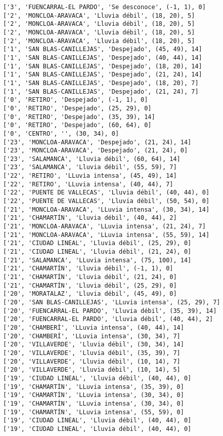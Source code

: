 \documentclass[11pt]{article}
\begin{document}
\begin{Verbatim}[commandchars=\\\{\}]
['3', 'FUENCARRAL-EL PARDO', 'Se desconoce', (-1, 1), 0]
['2', 'MONCLOA-ARAVACA', 'Lluvia débil', (18, 20), 5]
['2', 'MONCLOA-ARAVACA', 'Lluvia débil', (18, 20), 5]
['2', 'MONCLOA-ARAVACA', 'Lluvia débil', (18, 20), 5]
['2', 'MONCLOA-ARAVACA', 'Lluvia débil', (18, 20), 5]
['1', 'SAN BLAS-CANILLEJAS', 'Despejado', (45, 49), 14]
['1', 'SAN BLAS-CANILLEJAS', 'Despejado', (40, 44), 14]
['1', 'SAN BLAS-CANILLEJAS', 'Despejado', (18, 20), 14]
['1', 'SAN BLAS-CANILLEJAS', 'Despejado', (21, 24), 14]
['1', 'SAN BLAS-CANILLEJAS', 'Despejado', (18, 20), 7]
['1', 'SAN BLAS-CANILLEJAS', 'Despejado', (21, 24), 7]
['0', 'RETIRO', 'Despejado', (-1, 1), 0]
['0', 'RETIRO', 'Despejado', (25, 29), 0]
['0', 'RETIRO', 'Despejado', (35, 39), 14]
['0', 'RETIRO', 'Despejado', (60, 64), 0]
['0', 'CENTRO', '', (30, 34), 0]
['23', 'MONCLOA-ARAVACA', 'Despejado', (21, 24), 14]
['23', 'MONCLOA-ARAVACA', 'Despejado', (21, 24), 0]
['23', 'SALAMANCA', 'Lluvia débil', (60, 64), 14]
['23', 'SALAMANCA', 'Lluvia débil', (55, 59), 7]
['22', 'RETIRO', 'LLuvia intensa', (45, 49), 14]
['22', 'RETIRO', 'LLuvia intensa', (40, 44), 7]
['22', 'PUENTE DE VALLECAS', 'Lluvia débil', (40, 44), 0]
['22', 'PUENTE DE VALLECAS', 'Lluvia débil', (50, 54), 0]
['21', 'MONCLOA-ARAVACA', 'LLuvia intensa', (30, 34), 14]
['21', 'CHAMARTÍN', 'Lluvia débil', (40, 44), 2]
['21', 'MONCLOA-ARAVACA', 'LLuvia intensa', (21, 24), 7]
['21', 'MONCLOA-ARAVACA', 'LLuvia intensa', (55, 59), 14]
['21', 'CIUDAD LINEAL', 'Lluvia débil', (25, 29), 0]
['21', 'CIUDAD LINEAL', 'Lluvia débil', (21, 24), 0]
['21', 'SALAMANCA', 'LLuvia intensa', (75, 100), 14]
['21', 'CHAMARTÍN', 'Lluvia débil', (-1, 1), 0]
['21', 'CHAMARTÍN', 'Lluvia débil', (21, 24), 0]
['21', 'CHAMARTÍN', 'Lluvia débil', (25, 29), 0]
['20', 'MORATALAZ', 'Lluvia débil', (45, 49), 0]
['20', 'SAN BLAS-CANILLEJAS', 'LLuvia intensa', (25, 29), 7]
['20', 'FUENCARRAL-EL PARDO', 'Lluvia débil', (35, 39), 14]
['20', 'FUENCARRAL-EL PARDO', 'Lluvia débil', (40, 44), 2]
['20', 'CHAMBERÍ', 'LLuvia intensa', (40, 44), 14]
['20', 'CHAMBERÍ', 'LLuvia intensa', (30, 34), 7]
['20', 'VILLAVERDE', 'Lluvia débil', (30, 34), 14]
['20', 'VILLAVERDE', 'Lluvia débil', (35, 39), 7]
['20', 'VILLAVERDE', 'Lluvia débil', (10, 14), 7]
['20', 'VILLAVERDE', 'Lluvia débil', (10, 14), 5]
['19', 'CIUDAD LINEAL', 'Lluvia débil', (40, 44), 0]
['19', 'CHAMARTÍN', 'LLuvia intensa', (35, 39), 0]
['19', 'CHAMARTÍN', 'LLuvia intensa', (30, 34), 0]
['19', 'CHAMARTÍN', 'LLuvia intensa', (30, 34), 0]
['19', 'CHAMARTÍN', 'LLuvia intensa', (55, 59), 0]
['19', 'CIUDAD LINEAL', 'Lluvia débil', (40, 44), 0]
['19', 'CIUDAD LINEAL', 'Lluvia débil', (40, 44), 0]

\end{Verbatim}
\end{document}
